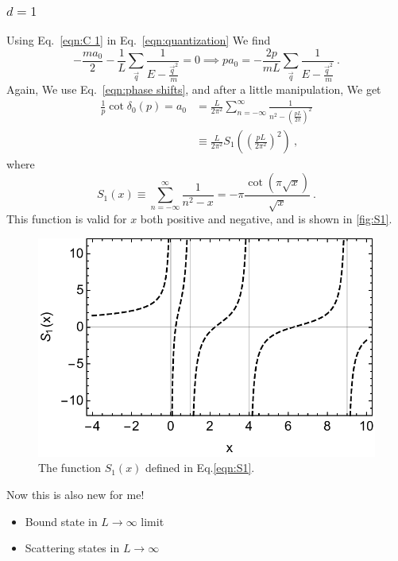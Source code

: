 \documentclass[11pt]{article}
\begin{document}
\subsubsection{$d=1$}
Using Eq.~\eqref{eqn:C 1} in Eq.~\eqref{eqn:quantization} We find
\begin{equation}
-\frac{ma_0}{2}-\frac{1}{L}\sum_{\vec{q}} \frac { 1 } { E - \frac{\vec{q}^2}{m} }=0
\implies
p a_0=-\frac{2p}{mL}\sum_{\vec{q}} \frac { 1 } { E - \frac{\vec{q}^2}{m} }\ .
\end{equation}
Again, We use Eq.~\eqref{eqn:phase shifts}, and after a little manipulation, We get
\begin{align}
\frac{1}{p}\cot\delta_0(p)=a_0&=\frac{L}{2\pi^2}\sum_{n=-\infty}^{\infty} \frac { 1 } { n^2 -\left(\frac{pL}{2\pi}\right)^2}\\
 &\equiv\frac{L}{2\pi^2} S_1\left(\left(\frac{pL}{2\pi^2}\right)^2\right)\ ,
\end{align}
where
\begin{equation}\label{eqn:S1}
S_1(x)\equiv\sum_{n=-\infty}^{\infty} \frac { 1 } { n^2 -x}=-\pi\frac{\cot(\pi\sqrt{x})}{\sqrt{x}}\ .
\end{equation}
This function is valid for $x$ both positive and negative, and is shown in \autoref{fig:S1}.
\begin{figure}
\center
\includegraphics[width=.8\columnwidth]{figure/S1.pdf}
\caption{The function $S_1(x)$ defined in Eq.\eqref{eqn:S1}.\label{fig:S1}}
\end{figure}
Now this is also new for me!

\begin{itemize}
\item Bound state in $L\to\infty$ limit
\item Scattering states in $L\to\infty$
\end{itemize}
\end{document}
